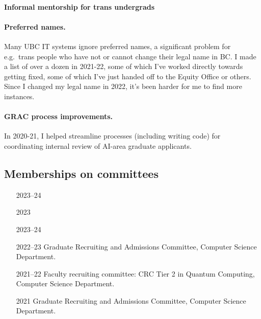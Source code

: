 \documentclass[10pt]{article}
\begin{document}

\paragraph{Informal mentorship for trans undergrads}

\paragraph{Preferred names.}
{%
Many UBC IT systems ignore preferred names,
a significant problem for e.g.\ trans people who have not or cannot change their legal name in BC.
I made a list of over a dozen in 2021-22,
some of which I've worked directly towards getting fixed,
some of which I've just handed off to the Equity Office or others.
Since I changed my legal name in 2022, it's been harder for me to find more instances.
}

\paragraph{GRAC process improvements.}
In 2020-21, I helped streamline processes (including writing code) for coordinating internal review of AI-area graduate applicants.


\subsection{Memberships on committees} %

\begin{itemize}[leftmargin=5em]
  \item[2023--24] 
  \item[2023] 
  \item[2023--24] 
  \item[2022--23] Graduate Recruiting and Admissions Committee, Computer Science Department.
  \item[2021--22] Faculty recruiting committee: CRC Tier 2 in Quantum Computing, Computer Science Department.
  \item[2021] Graduate Recruiting and Admissions Committee, Computer Science Department.
\end{itemize}
\end{document}
